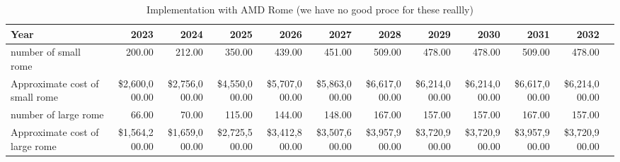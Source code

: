 \tiny \begin{longtable} { |p{}  |r  |r  |r  |r  |r  |r  |r  |r  |r  |r  |r |} 
\caption{Implementation with AMD Rome (we have no good proce for these reallly) \label{tab:opsRome}}\\ 
\hline 
\textbf{Year}&\textbf{2023}&\textbf{2024}&\textbf{2025}&\textbf{2026}&\textbf{2027}&\textbf{2028}&\textbf{2029}&\textbf{2030}&\textbf{2031}&\textbf{2032} \\ \hline
{number of small rome }&{200.00}&{212.00}&{350.00}&{439.00}&{451.00}&{509.00}&{478.00}&{478.00}&{509.00}&{478.00} \\ \hline
{Approximate cost of small rome }&{\$2,600,000.00}&{\$2,756,000.00}&{\$4,550,000.00}&{\$5,707,000.00}&{\$5,863,000.00}&{\$6,617,000.00}&{\$6,214,000.00}&{\$6,214,000.00}&{\$6,617,000.00}&{\$6,214,000.00} \\ \hline
{number of large rome }&{66.00}&{70.00}&{115.00}&{144.00}&{148.00}&{167.00}&{157.00}&{157.00}&{167.00}&{157.00} \\ \hline
{Approximate cost of large rome }&{\$1,564,200.00}&{\$1,659,000.00}&{\$2,725,500.00}&{\$3,412,800.00}&{\$3,507,600.00}&{\$3,957,900.00}&{\$3,720,900.00}&{\$3,720,900.00}&{\$3,957,900.00}&{\$3,720,900.00} \\ \hline
\end{longtable} \normalsize
